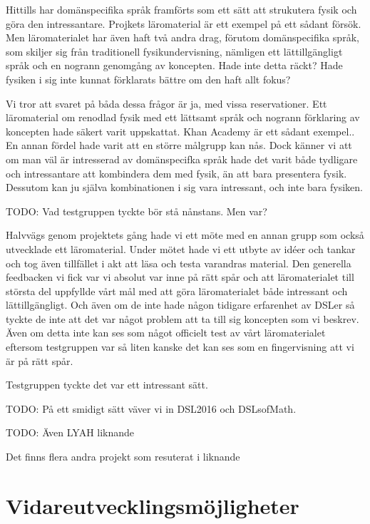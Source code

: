 \begin{binge}
Hittills har domänspecifika språk framförts som ett sätt att strukutera fysik
och göra den intressantare. Projkets läromaterial är ett exempel på ett sådant
försök. Men läromaterialet har även haft två andra drag, förutom domänspecifika
språk, som skiljer sig från traditionell fysikundervisning, nämligen ett
lättillgängligt språk och en nogrann genomgång av koncepten. Hade inte detta
räckt? Hade fysiken i sig inte kunnat förklarats bättre om den haft allt fokus?

Vi tror att svaret på båda dessa frågor är ja, med vissa reservationer. Ett
läromaterial om renodlad fysik med ett lättsamt språk och nogrann förklaring av
koncepten hade säkert varit uppskattat. Khan Academy är ett sådant
exempel.\cite{khan}. En annan fördel hade varit att en större målgrupp kan nås.
Dock känner vi att om man väl är intresserad av domänspecifka språk hade det
varit både tydligare och intressantare att kombindera dem med fysik, än att bara
presentera fysik. Dessutom kan ju själva kombinationen i sig vara intressant,
och inte bara fysiken.

TODO: Vad testgruppen tyckte bör stå nånstans. Men var?

Halvvägs genom projektets gång hade vi ett möte med en annan grupp som också
utvecklade ett läromaterial. Under mötet hade vi ett utbyte av idéer och tankar
och tog även tillfället i akt att läsa och testa varandras material. Den
generella feedbacken vi fick var vi absolut var inne på rätt spår och att
läromaterialet till största del uppfyllde vårt mål med att göra läromaterialet
både intressant och lättillgängligt. Och även om de inte hade någon tidigare
erfarenhet av DSLer så tyckte de inte att det var något problem att ta till sig
koncepten som vi beskrev. Även om detta inte kan ses som något officielt test av
vårt läromaterialet eftersom testgruppen var så liten kanske det kan ses som en
fingervisning att vi är på rätt spår.

Testgruppen tyckte det var ett intressant sätt.

TODO: På ett smidigt sätt väver vi in DSL2016 och DSLsofMath.

TODO: Även LYAH liknande

Det finns flera andra projekt som resuterat i liknande 

\section{Vidareutvecklingsmöjligheter}


\end{binge}
